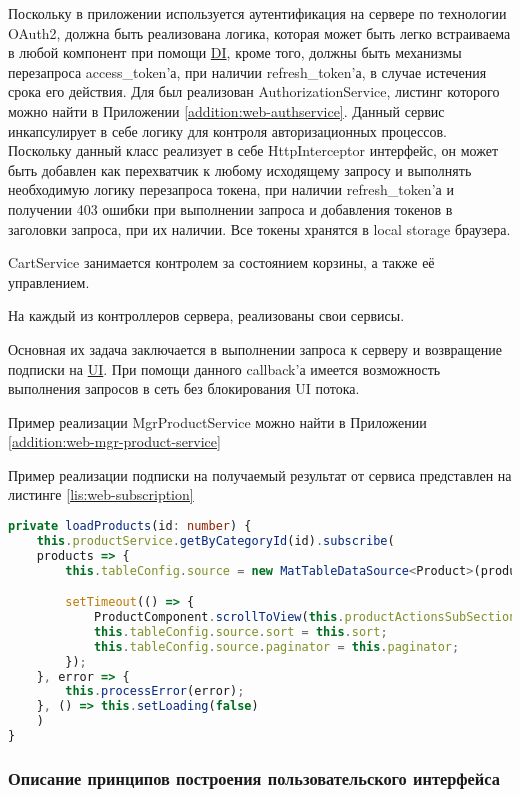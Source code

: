 Поскольку в приложении используется аутентификация на сервере по технологии OAuth2, должна быть реализована логика, которая может быть легко встраиваема в любой компонент при помощи \hyperlink{gloss:di}{DI}, кроме того, должны быть механизмы перезапроса access\_token’а, при наличии refresh\_token’а, в случае истечения срока его действия.
Для был реализован AuthorizationService, листинг которого можно найти в Приложении \ref{addition:web-authservice}.
Данный сервис инкапсулирует в себе логику для контроля авторизационных процессов.
Поскольку данный класс реализует в себе HttpInterceptor интерфейс, он может быть добавлен как перехватчик к любому исходящему запросу и выполнять необходимую логику перезапроса токена, при наличии refresh\_token’а и получении 403 ошибки при выполнении запроса и добавления токенов в заголовки запроса, при их наличии.
Все токены хранятся в local storage браузера.

CartService занимается контролем за состоянием корзины, а также её управлением.

На каждый из контроллеров сервера, реализованы свои сервисы.

Основная их задача заключается в выполнении запроса к серверу и возвращение подписки на \hyperlink{gloss:ui}{UI}.
При помощи данного callback’а имеется возможность выполнения запросов в сеть без блокирования UI потока.

Пример реализации MgrProductService можно найти в Приложении \ref{addition:web-mgr-product-service}

Пример реализации подписки на получаемый результат от сервиса представлен на листинге \ref{lis:web-subscription}

\begin{lstlisting}[language=TypeScript, captionpos=b,
label={lis:web-subscription},
caption={Пример реализации подписки на ожидаемый результат от сервера}
]
private loadProducts(id: number) {
    this.productService.getByCategoryId(id).subscribe(
    products => {
        this.tableConfig.source = new MatTableDataSource<Product>(products);

        setTimeout(() => {
            ProductComponent.scrollToView(this.productActionsSubSection);
            this.tableConfig.source.sort = this.sort;
            this.tableConfig.source.paginator = this.paginator;
        });
    }, error => {
        this.processError(error);
    }, () => this.setLoading(false)
    )
}
\end{lstlisting}

\subsubsection{Описание принципов построения пользовательского интерфейса}\indent

